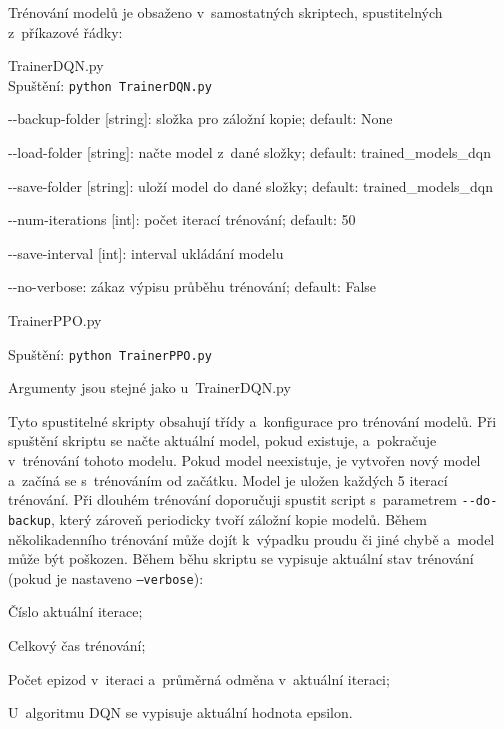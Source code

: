 Trénování modelů je obsaženo v~samostatných skriptech, spustitelných z~příkazové řádky:
\begin{myitemize}
  \item TrainerDQN.py\\
  Spuštění: \texttt{python TrainerDQN.py}
  \begin{myitemize}[${}$]
    \item -{}-backup-folder [string]: složka pro záložní kopie; default: None
    \item -{}-load-folder [string]: načte model z~dané složky; default: trained\_models\_dqn
    \item -{}-save-folder [string]: uloží model do dané složky; default: trained\_models\_dqn
    \item -{}-num-iterations [int]: počet iterací trénování; default: 50
    \item -{}-save-interval [int]: interval ukládání modelu
    \item -{}-no-verbose: zákaz výpisu průběhu trénování; default: False
  \end{myitemize}
  \item TrainerPPO.py
  \item Spuštění: \texttt{python TrainerPPO.py}
  \begin{myitemize}
  \item Argumenty jsou stejné jako u~TrainerDQN.py
  \end{myitemize}
\end{myitemize}

Tyto spustitelné skripty obsahují třídy a~konfigurace pro trénování modelů.
Při spuštění skriptu se načte aktuální model, pokud existuje, a~pokračuje v~trénování tohoto modelu.
Pokud model neexistuje, je vytvořen nový model a~začíná se s~trénováním od začátku.
Model je uložen každých 5 iterací trénování.
Při dlouhém trénování doporučuji spustit script s~parametrem \texttt{-{}-do-backup}, který zároveň periodicky tvoří záložní kopie modelů.
Během několikadenního trénování může dojít k~výpadku proudu či jiné chybě a~model může být poškozen.
Během běhu skriptu se vypisuje aktuální stav trénování (pokud je nastaveno \texttt{--verbose}):
\begin{myitemize}
  \item Číslo aktuální iterace;
  \item Celkový čas trénování;
  \item Počet epizod v~iteraci a~průměrná odměna v~aktuální iteraci;
  \item U~algoritmu DQN se vypisuje aktuální hodnota epsilon.
\end{myitemize}

